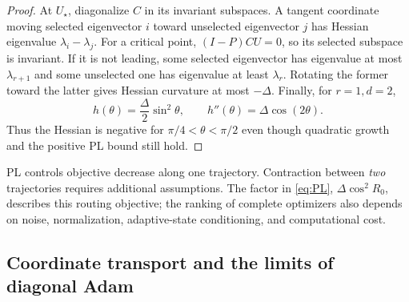 \begin{proof}
At $U_\star$, diagonalize $C$ in its invariant subspaces. A tangent
coordinate moving selected eigenvector $i$ toward unselected eigenvector
$j$ has Hessian eigenvalue $\lambda_i-\lambda_j$. For a critical point,
$(I-P)CU=0$, so its selected subspace is invariant. If it is not leading,
some selected eigenvector has eigenvalue at most $\lambda_{r+1}$ and some
unselected one has eigenvalue at least $\lambda_r$. Rotating the former
toward the latter gives Hessian curvature at most $-\Delta$.
Finally, for $r=1,d=2$,
\begin{equation}
 h(\theta)=\frac\Delta2\sin^2\theta,\qquad
 h''(\theta)=\Delta\cos(2\theta).
 \label{eq:nonconvex-counterexample}
\end{equation}
Thus the Hessian is negative for $\pi/4<\theta<\pi/2$ even though
quadratic growth and the positive PL bound still hold.
\end{proof}

PL controls objective decrease along one trajectory. Contraction between
\emph{two} trajectories requires additional assumptions. The factor in
\eqref{eq:PL}, $\Delta\cos^2R_0$, describes this routing objective; the
ranking of complete optimizers also depends on noise, normalization,
adaptive-state conditioning, and computational cost.

\subsection{Coordinate transport and the limits of diagonal Adam}
\label{app:transport}

